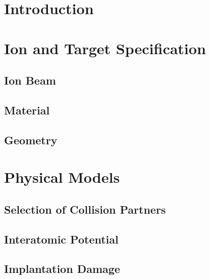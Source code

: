 \documentclass[twoside,12pt]{book}
\begin{document}
%
%
%

%
%
\begin{titlepage}

\end{titlepage}
%
%
\tableofcontents
\thispagestyle{empty}
%
%
\chapter{Introduction}
\label{k:intro}

%
%
\chapter{Ion and Target Specification}
\label{k:obj}

%
\section{Ion Beam}
\label{s:beam}

%
\section{Material}
\label{s:mater}

%
\section{Geometry}
\label{s:geometry}

%
%
\chapter{Physical Models}
\label{k:phys}

%
\section{Selection of Collision Partners}
\label{s:coll}

%
\section{Interatomic Potential}
\label{s:pot}

%
\section{Implantation Damage}
\label{s:dam}

%
\end{document}
